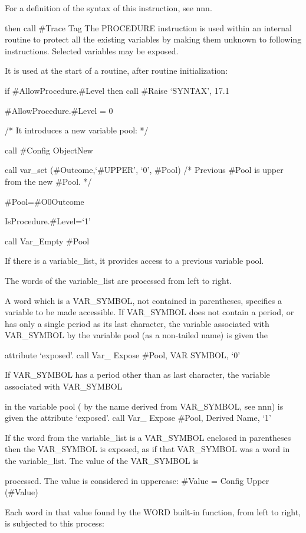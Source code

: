 For a definition of the syntax of this instruction, see nnn.

then call \#Trace Tag The PROCEDURE instruction is used within an
internal routine to protect all the existing variables by making them
unknown to following instructions. Selected variables may be exposed.

It is used at the start of a routine, after routine initialization:

if \#AllowProcedure.\#Level then call \#Raise `SYNTAX', 17.1

\#AllowProcedure.\#Level = 0

/* It introduces a new variable pool: */

call \#Config ObjectNew

call var\_set (\#Outcome,`\#UPPER', `0', \#Pool) /* Previous \#Pool is
upper from the new \#Pool. */

\#Pool=\#O0Outcome

IsProcedure.\#Level=`1'

call Var\_Empty \#Pool

If there is a variable\_list, it provides access to a previous variable
pool.

The words of the variable\_list are processed from left to right.

A word which is a VAR\_SYMBOL, not contained in parentheses, specifies a
variable to be made accessible. If VAR\_SYMBOL does not contain a
period, or has only a single period as its last character, the variable
associated with VAR\_SYMBOL by the variable pool (as a non-tailed name)
is given the

attribute `exposed'. call Var\_ Expose \#Pool, VAR SYMBOL, `0'

If VAR\_SYMBOL has a period other than as last character, the variable
associated with VAR\_SYMBOL

in the variable pool ( by the name derived from VAR\_SYMBOL, see nnn) is
given the attribute `exposed'. call Var\_ Expose \#Pool, Derived Name,
`1'

If the word from the variable\_list is a VAR\_SYMBOL enclosed in
parentheses then the VAR\_SYMBOL is exposed, as if that VAR\_SYMBOL was
a word in the variable\_list. Tne value of the VAR\_SYMBOL is

processed. The value is considered in uppercase: \#Value = Config Upper
(\#Value)

Each word in that value found by the WORD built-in function, from left
to right, is subjected to this process:

